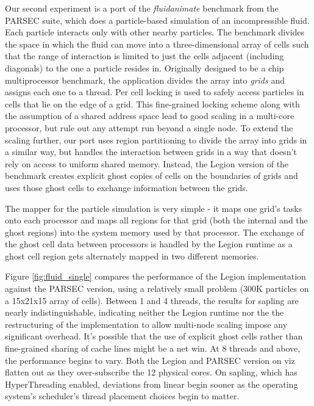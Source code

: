 Our second experiment is a port of the \emph{fluidanimate} benchmark from the PARSEC suite\cite{bienia11benchmarking},
which does a particle-based simulation of an incompressible fluid.  Each particle interacts only with other nearby
particles. The benchmark divides the space in which the fluid can move into a three-dimensional array of cells 
such that the range of interaction is limited to just the
cells adjacent (including diagonals) to the one a particle resides in.  Originally designed to be a
chip multiprocessor benchmark, the application divides the array into {\em grids} and assigns each one to 
a thread.  Per cell locking is used to safely access particles in cells that lie
on the edge of a grid.  This fine-grained locking scheme along with the assumption of a shared address space lead to
good scaling in a multi-core processor, but rule out any attempt run beyond a single node.  To extend the
scaling further, our port uses region partitioning to divide the array into grids in a similar
way, but handles the interaction between grids in a way that doesn't rely on access to uniform shared memory.
Instead, the Legion version of the benchmark creates explicit ghost copies of cells on the boundaries of grids
and uses those ghost cells to exchange information between the grids.

The mapper for the particle simulation is very simple - it maps one grid's tasks onto each processor and
maps all regions for that grid (both the internal and the ghost regions) into the system memory used by that processor.
The exchange of the ghost cell data between processors is handled by the Legion runtime as a ghost cell region
gets alternately mapped in two different memories.

Figure \ref{fig:fluid_single} compares the performance of the Legion implementation against the PARSEC version,
using a relatively small problem (300K particles on a 15x21x15 array of cells).  Between 1 and 4 threads, the
results for sapling are nearly indistinguishable, indicating 
neither the Legion runtime nor the the restructuring of the implementation to allow multi-node scaling impose
any significant overhead.  It's possible that the use of explicit ghost cells rather than 
fine-grained sharing of cache lines might be a net win.  At 8 threads and above, the performance begins to vary.
Both the Legion and PARSEC version on viz flatten out as they over-subscribe the 12 physical cores.  On sapling,
which has HyperThreading enabled, deviations from linear begin sooner as the operating system's scheduler's
thread placement choices begin to matter.


